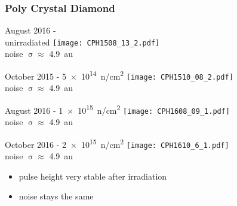 \begin{frame}
	\frametitle{Poly Crystal Diamond}
	\begin{minipage}{2.8cm}
		\centering
		August 2016 - \\unirradiated
		\texttt{[image: CPH1508\_13\_2.pdf]}\\
		noise $\upsigma\approx$ \SI{4.9}{au}
	\end{minipage}
	\hspace*{2pt}
	\begin{minipage}{2.8cm}
		\centering
		October 2015 - \SI[exponent-product = \cdot]{5e14}{n/cm^{2}}
		\texttt{[image: CPH1510\_08\_2.pdf]}\\
		noise $\upsigma\approx$ \SI{4.9}{au}
	\end{minipage}
	\hspace*{2pt}
	\begin{minipage}{2.8cm}
		\centering
		August 2016 - \SI[exponent-product = \cdot]{1e15}{n/cm^{2}}
		\texttt{[image: CPH1608\_09\_1.pdf]}\\
		noise $\upsigma \approx$ \SI{4.9}{au}
	\end{minipage}
	\hspace*{2pt}
	\begin{minipage}{2.8cm}
		\centering
		October 2016 - \SI[exponent-product = \cdot]{2e15}{n/cm^{2}}
		\texttt{[image: CPH1610\_6\_1.pdf]}\\
		noise $\upsigma \approx$ \SI{4.9}{au}
	\end{minipage}\s
	\begin{itemize}
		\item pulse height very stable after irradiation
		\item noise stays the same
	\end{itemize}
\end{frame}
